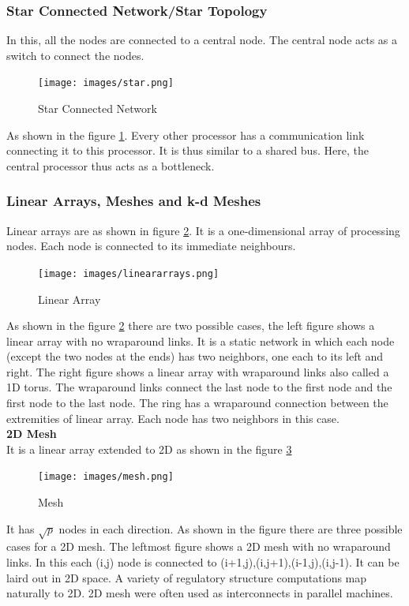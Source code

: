 \documentclass[12pt]{book}
\begin{document}
\subsubsection{Star Connected Network/Star Topology}
In this, all the nodes are connected to a central node. The central node acts as a switch to connect the nodes.
\begin{figure}[H]
    \centering
    \texttt{[image: images/star.png]}
    \caption{Star Connected Network}
    \label{fig:star}
\end{figure}
As shown in the figure \ref{fig:star}. Every other processor has a communication link connecting it to this processor. It is thus similar to 
a shared bus. Here, the central processor thus acts as a bottleneck.

\subsubsection{Linear Arrays, Meshes and k-d Meshes}
Linear arrays are as shown in figure \ref{fig:linear}. It is a one-dimensional array of processing nodes. Each node is connected to its immediate neighbours.
\begin{figure}[H]
    \centering
    \texttt{[image: images/lineararrays.png]}
    \caption{Linear Array}
    \label{fig:linear}
\end{figure}
As shown in the figure \ref{fig:linear} there are two possible cases, the left figure shows a linear array with no wraparound links. It is a 
static network in which each node (except the two nodes at the ends) has two neighbors, one each to its left and right.
The right figure shows a linear array with wraparound links also called a 1D torus. The wraparound links connect the last node to the first node and the first node to the last node.
The ring has a wraparound connection between the extremities of linear array. Each node has two neighbors in this case.\\
\textbf{2D Mesh}\\
It is a linear array extended to 2D as shown in the figure \ref{fig:2dmesh}
\begin{figure}[H]
    \centering
    \texttt{[image: images/mesh.png]}
    \caption{Mesh}
    \label{fig:2dmesh}
\end{figure}
It has $\sqrt{p}$ nodes in each direction. As shown in the figure there are three possible cases for a 2D mesh.
The leftmost figure shows a 2D mesh with no wraparound links. In this each (i,j) node is connected to (i+1,j),(i,j+1),(i-1,j),(i,j-1).
It can be laird out in 2D space. A variety of regulatory structure computations map naturally to 2D. 2D mesh were often used as interconnects in parallel machines.\\
\end{document}
